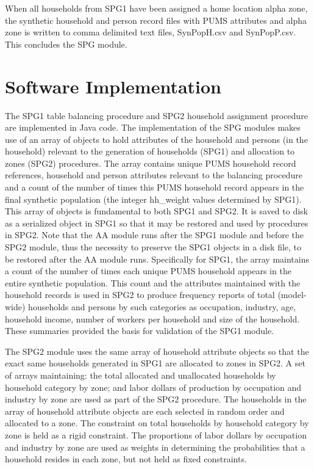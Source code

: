 \noindent When all households from SPG1 have been assigned a home location alpha zone, the synthetic household and person record files with PUMS attributes and alpha zone is written to comma delimited text files, SynPopH.csv and SynPopP.csv. This concludes the SPG module.

\section{Software Implementation}
The SPG1 table balancing procedure and SPG2 household assignment procedure are implemented in Java code. The implementation of the SPG modules makes use of an array of objects to hold attributes of the household and persons (in the household) relevant to the generation of households (SPG1) and allocation to zones (SPG2) procedures. The array contains unique PUMS household record references, household and person attributes relevant to the balancing procedure and a count of the number of times this PUMS household record appears in the final synthetic population (the integer hh\_weight values determined by SPG1). This array of objects is fundamental to both SPG1 and SPG2. It is saved to disk as a serialized object in SPG1 so that it may be restored and used by procedures in SPG2. Note that the AA module runs after the SPG1 module and before the SPG2 module, thus the necessity to preserve the SPG1 objects in a disk file, to be restored after the AA module runs. Specifically for SPG1, the array maintains a count of the number of times each unique PUMS household appears in the entire synthetic population. This count and the attributes maintained with the household records is used in SPG2 to produce frequency reports of total (model-wide) households and persons by such categories as occupation, industry, age, household income, number of workers per household and size of the household. These summaries provided the basis for validation of the SPG1 module.

The SPG2 module uses the same array of household attribute objects so that the exact same households generated in SPG1 are allocated to zones in SPG2. A set of arrays maintaining: the total allocated and unallocated households by household category by zone; and labor dollars of production by occupation and industry by zone are used as part of the SPG2 procedure. The households in the array of household attribute objects are each selected in random order and allocated to a zone. The constraint on total households by household category by zone is held as a rigid constraint. The proportions of labor dollars by occupation and industry by zone are used as weights in determining the probabilities that a household resides in each zone, but not held as fixed constraints.

